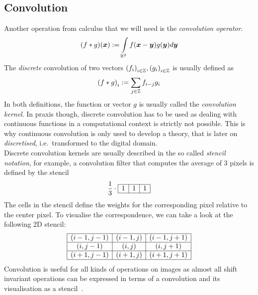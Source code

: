 \subsection{Convolution}
Another operation from calculus that we will need is the \textit{convolution operator}.\\
\begin{equation}
    (f * g)(\boldsymbol x) := \int\limits_{\mathbb{R}^2} f(\boldsymbol x-\boldsymbol y)g(\boldsymbol y)d\boldsymbol y\label{eq:2DConv}
\end{equation}
The \textit{discrete} convolution of two vectors ${(f_i)}_{i\in\mathbb{Z}}, {(g_i)}_{i\in\mathbb{Z}}$ is usually defined as
\begin{equation}
    {(f*g)}_i := \sum_{j\in\mathbb{Z}} f_{i-j}g_i
\end{equation}
In both definitions, the function or vector $g$ is usually called the \textit{convolution kernel}.
In praxis though, discrete convolution has to be used as dealing with continuous functions in a
computational context is strictly not possible. This is why continuous convolution is only used to
develop a theory, that is later on \textit{discretised}, i.e.\ transformed to the digital
domain.\\
Discrete convolution kernels are usually described in the so called \textit{stencil notation}, for
example, a convolution filter that computes the average of 3 pixels is defined by the stencil
\begin{equation}
    \frac{1}{3} \cdot \begin{array}{|c|c|c|}
       \hline
       1 & 1 & 1\\
       \hline
    \end{array}
\end{equation}
The cells in the stencil define the weights for the corresponding pixel relative to the center
pixel. To visualise the correspondence, we can take a look at the following 2D stencil:
\begin{equation}
    \begin{array}{|c|c|c|}
       \hline
       (i-1,j-1) & (i-1, j) & (i-1, j+1)\\\hline
       (i,j-1) & (i, j) & (i, j+1)\\\hline
       (i+1,j-1) & (i+1, j) & (i+1, j+1)\\\hline
    \end{array}
\end{equation}
Convolution is useful for all kinds of operations on images as almost all shift invariant operations can be
expressed in terms of a convolution and its visualisation as a stencil~\cite{ipcv}.
